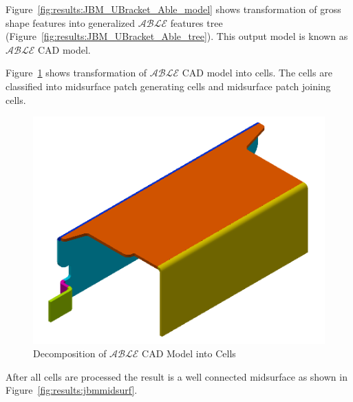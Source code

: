 \begin{minipage}{\linewidth}
\begin{minipage}[c]{0.3\linewidth}
 \label{fig:results:JBM_UBracket_Able_tree}
\end{minipage}
\end{minipage}


Figure~\ref{fig:results:JBM_UBracket_Able_model} shows transformation of gross shape features into generalized $\mathcal{ABLE}$ features tree (Figure~\ref{fig:results:JBM_UBracket_Able_tree}). This output model is known as $\mathcal{ABLE}$ CAD model. 
%



Figure~\ref{fig:results:jbmdecomp} shows transformation of $\mathcal{ABLE}$ CAD model into cells. The cells are classified into midsurface patch generating cells and midsurface patch joining cells.


\begin{figure}[!h]
\centering     %
\includegraphics[width=0.62\linewidth,valign=t]{images/JBM_UBracket_decomp_model}
\caption{Decomposition of $\mathcal{ABLE}$ CAD Model into Cells}
\label{fig:results:jbmdecomp}
\end{figure}


After all cells are processed the result is a well connected midsurface as shown in Figure~\ref{fig:results:jbmmidsurf}.


